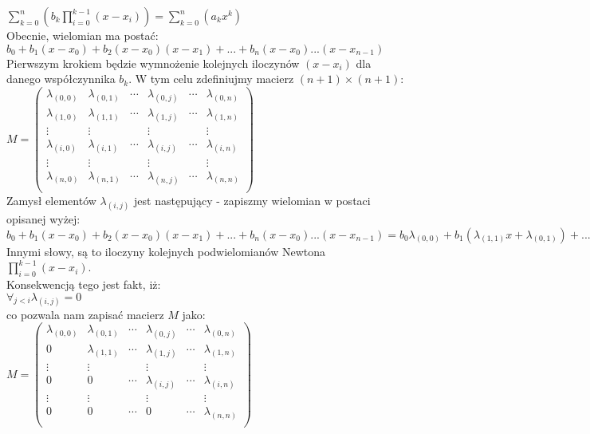 \documentclass[a4paper,12pt]{article}
\newcommand{\id}{\noindent}
\newcommand{\el}[2]{\lambda_{(#1, #2)}}
\newcommand{\fa}[1]{\displaystyle\mathop{\forall}_{#1}}
\begin{document}
$\sum\limits_{k=0}^{n}\left( b_k\prod\limits_{i=0}^{k-1}(x-x_i) \right ) = \sum\limits_{k=0}^{n}\left(a_kx^k\right)$ \\

\id
Obecnie, wielomian ma postać: \\

$b_0 + b_1(x-x_0) + b_2(x-x_0)(x-x_1) + ... + b_n(x-x_0)...(x-x_{n-1})$ \\

\id
Pierwszym krokiem będzie wymnożenie kolejnych iloczynów $(x-x_i)$ dla danego współczynnika $b_k$. W tym celu zdefiniujmy macierz $(n+1)\times (n+1)$: \\

$M=\begin{pmatrix}
\lambda_{(0,0)} & \lambda_{(0,1)} & \cdots & \lambda_{(0,j)} & \cdots & \lambda_{(0,n)}\\ 
\lambda_{(1,0)} & \lambda_{(1,1)} & \cdots & \lambda_{(1,j)} & \cdots & \lambda_{(1,n)}\\ 
\vdots & \vdots & & \vdots & & \vdots\\ 
\lambda_{(i,0)} & \lambda_{(i,1)} & \cdots & \lambda_{(i,j)} & \cdots & \lambda_{(i,n)}\\ 
\vdots & \vdots &  & \vdots &  & \vdots\\ 
\lambda_{(n,0)} & \lambda_{(n,1)} & \cdots & \lambda_{(n,j)} & \cdots & \lambda_{(n,n)}\\ 
\end{pmatrix}$ \\

\id
Zamysł elementów $\el{i}{j}$ jest następujący - zapiszmy wielomian w postaci opisanej wyżej: \\

$b_0 + b_1(x-x_0) + b_2(x-x_0)(x-x_1) + ... + b_n(x-x_0)...(x-x_{n-1}) = b_0\el{0}{0} + b_1(\el{1}{1}x+\el{0}{1}) + ... + b_n(\el{n}{n}x^n + \el{n-1}{1}x^{n-1} + ... + \el{0}{n}x^0)$ \\

\id
Innymi słowy, są to iloczyny kolejnych podwielomianów Newtona $\prod\limits_{i=0}^{k-1}(x-x_i)$. \\

\id
Konsekwencją tego jest fakt, iż: \\

$\fa{j<i}\el{i}{j} = 0$ \\

\id
co pozwala nam zapisać macierz $M$ jako: \\

$M = \begin{pmatrix}
\lambda_{(0,0)} & \el{0}{1} & \cdots & \el{0}{j} & \cdots & \el{0}{n}\\ 
0 & \lambda_{(1,1)} & \cdots & \el{1}{j} & \cdots & \el{1}{n} \\ 
\vdots & \vdots & & \vdots & & \vdots\\ 
0 & 0 & \cdots & \lambda_{(i,j)} & \cdots & \el{i}{n}\\ 
\vdots & \vdots &  & \vdots &  & \vdots\\ 
0 & 0 & \cdots & 0 & \cdots & \lambda_{(n,n)}\\ 
\end{pmatrix}$ \\
\end{document}
